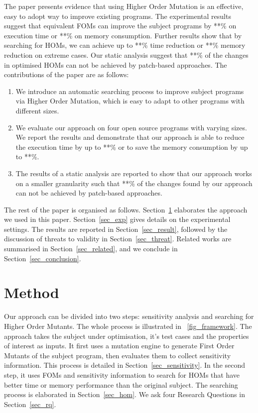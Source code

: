 \documentclass[oribibl]{llncs}
\begin{document}
The paper presents evidence that using Higher Order Mutation is an effective, easy to adopt way to improve existing programs. 
The experimental results suggest that equivalent FOMs can improve the subject programs by **\% on execution time or **\% on memory consumption.
Further results show that by searching for HOMs, we can achieve up to **\% time reduction or **\% memory reduction on extreme cases.
Our static analysis suggest that **\% of the changes in optimised HOMs can not be achieved by patch-based approaches.
The contributions of the paper are as follows:
\begin{enumerate}
\item We introduce an automatic searching process to improve subject programs via Higher Order Mutation, which is easy to adapt to other programs with different sizes.
\item We evaluate our approach on four open source programs with varying sizes. We report the results and demonstrate that our approach is able to reduce the execution time by up to **\% or to save the memory consumption by up to **\%.
\item The results of a static analysis are reported to show that our approach works on a smaller granularity such that **\% of the changes found by our approach can not be achieved by patch-based approaches.
\end{enumerate}

The rest of the paper is organised as follows. 
Section~\ref{sec_method} elaborates the approach we used in this paper.
Section~\ref{sec_exp} gives details on the experimental settings.
The results are reported in Section~\ref{sec_result}, followed by the discussion of threats to validity in Section~\ref{sec_threat}.
Related works are summarised in Section~\ref{sec_related}, and we conclude in Section~\ref{sec_conclusion}.

\section{Method}
\label{sec_method}

Our approach can be divided into two steps: sensitivity analysis and searching for Higher Order Mutants.
The whole process is illustrated in \figurename~\ref{fig_framework}.
The approach takes the subject under optimisation, it's test cases and the properties of interest as inputs.
It first uses a mutation engine to generate First Order Mutants of the subject program, then evaluates them to collect sensitivity information.
This process is detailed in Section~\ref{sec_sensitivity}.
In the second step, it uses FOMs and sensitivity information to search for HOMs that have better time or memory performance than the original subject.
The searching process is elaborated in Section~\ref{sec_hom}.
We ask four Research Questions in Section~\ref{sec_rq}.
\end{document}
